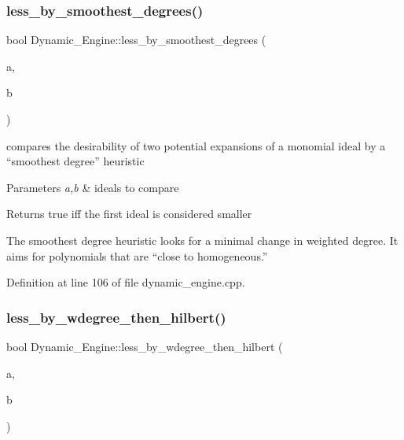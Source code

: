 \subsubsection{\texorpdfstring{less\+\_\+by\+\_\+smoothest\+\_\+degrees()}{less\_by\_smoothest\_degrees()}}
{\footnotesize\ttfamily bool Dynamic\+\_\+\+Engine\+::less\+\_\+by\+\_\+smoothest\+\_\+degrees (\begin{DoxyParamCaption}\item[{\hyperlink{group___g_b_computation_class_dynamic___engine_1_1_p_p___with___ideal}{P\+P\+\_\+\+With\+\_\+\+Ideal} \&}]{a,  }\item[{\hyperlink{group___g_b_computation_class_dynamic___engine_1_1_p_p___with___ideal}{P\+P\+\_\+\+With\+\_\+\+Ideal} \&}]{b }\end{DoxyParamCaption})}



compares the desirability of two potential expansions of a monomial ideal by a ``smoothest degree'' heuristic 


\begin{DoxyParams}{Parameters}
{\em a,b} & ideals to compare \\
\hline
\end{DoxyParams}
\begin{DoxyReturn}{Returns}
{\ttfamily true} iff the first ideal is considered smaller
\end{DoxyReturn}
The smoothest degree heuristic looks for a minimal change in weighted degree. It aims for polynomials that are ``close to homogeneous.'' 

Definition at line 106 of file dynamic\+\_\+engine.\+cpp.

\mbox{\label{namespace_dynamic___engine_a06310dff730cbb5b133b3c907ceb6053}} 
\subsubsection{\texorpdfstring{less\+\_\+by\+\_\+wdegree\+\_\+then\+\_\+hilbert()}{less\_by\_wdegree\_then\_hilbert()}}
{\footnotesize\ttfamily bool Dynamic\+\_\+\+Engine\+::less\+\_\+by\+\_\+wdegree\+\_\+then\+\_\+hilbert (\begin{DoxyParamCaption}\item[{\hyperlink{group___g_b_computation_class_dynamic___engine_1_1_p_p___with___ideal}{P\+P\+\_\+\+With\+\_\+\+Ideal} \&}]{a,  }\item[{\hyperlink{group___g_b_computation_class_dynamic___engine_1_1_p_p___with___ideal}{P\+P\+\_\+\+With\+\_\+\+Ideal} \&}]{b }\end{DoxyParamCaption})}



